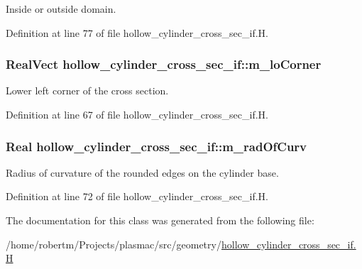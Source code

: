 Inside or outside domain. 



Definition at line 77 of file hollow\+\_\+cylinder\+\_\+cross\+\_\+sec\+\_\+if.\+H.

\subsubsection[{\texorpdfstring{m\+\_\+lo\+Corner}{m_loCorner}}]{\setlength{\rightskip}{0pt plus 5cm}Real\+Vect hollow\+\_\+cylinder\+\_\+cross\+\_\+sec\+\_\+if\+::m\+\_\+lo\+Corner\hspace{0.3cm}{\ttfamily [protected]}}\hypertarget{classhollow__cylinder__cross__sec__if_a7b1dc3ee2b9591d48a83d7a83435d742}{}\label{classhollow__cylinder__cross__sec__if_a7b1dc3ee2b9591d48a83d7a83435d742}


Lower left corner of the cross section. 



Definition at line 67 of file hollow\+\_\+cylinder\+\_\+cross\+\_\+sec\+\_\+if.\+H.

\subsubsection[{\texorpdfstring{m\+\_\+rad\+Of\+Curv}{m_radOfCurv}}]{\setlength{\rightskip}{0pt plus 5cm}Real hollow\+\_\+cylinder\+\_\+cross\+\_\+sec\+\_\+if\+::m\+\_\+rad\+Of\+Curv\hspace{0.3cm}{\ttfamily [protected]}}\hypertarget{classhollow__cylinder__cross__sec__if_afe1e4c0fcec88ded0114b68ba91f7580}{}\label{classhollow__cylinder__cross__sec__if_afe1e4c0fcec88ded0114b68ba91f7580}


Radius of curvature of the rounded edges on the cylinder base. 



Definition at line 72 of file hollow\+\_\+cylinder\+\_\+cross\+\_\+sec\+\_\+if.\+H.



The documentation for this class was generated from the following file\+:\begin{DoxyCompactItemize}
\item 
/home/robertm/\+Projects/plasmac/src/geometry/\hyperlink{hollow__cylinder__cross__sec__if_8H}{hollow\+\_\+cylinder\+\_\+cross\+\_\+sec\+\_\+if.\+H}\end{DoxyCompactItemize}
